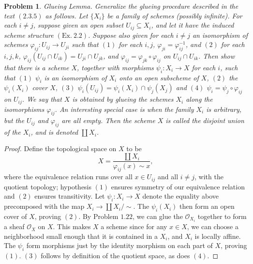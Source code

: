\documentclass[12pt,letterpaper]{article}
\newtheorem{problem}{Problem}[section]
\theoremstyle{definition}
\theoremstyle{remark}
\numberwithin{equation}{section}
\numberwithin{figure}{problem}
\newcommand{\OO}{\mathcal{O}}
\begin{document}
\begin{problem}
  \emph{Glueing Lemma}. Generalize the glueing procedure described in the text $(2.3.5)$ as follows. Let $\{X_i\}$ be a family of schemes (possibly infinite). For each $i \ne j$, suppose given an open subset $U_{ij} \subseteq X_i$, and let it have the induced scheme structure $(\mathrm{Ex}.~2.2)$. Suppose also given for each $i \ne j$ an isomorphism of schemes $\varphi_{ij}\colon U_{ij} \to U_{ji}$ such that $(1)$ for each $i,j$, $\varphi_{ji} = \varphi_{ij}^{-1}$, and $(2)$ for each $i,j,k$, $\varphi_{ij}(U_{ij} \cap U_{ik}) = U_{ji} \cap U_{jk}$, and $\varphi_{ij} = \varphi_{jk} \circ \varphi_{ij}$ on $U_{ij} \cap U_{ik}$. Then show that there is a scheme $X$, together with morphisms $\psi_i\colon X_i \to X$ for each $i$, such that $(1)$ $\psi_i$ is an isomorphism of $X_i$ onto an open subscheme of $X$, $(2)$ the $\psi_i(X_i)$ cover $X$, $(3)$ $\psi_i(U_{ij}) = \psi_i(X_i) \cap \psi_j(X_j)$ and $(4)$ $\psi_i = \psi_j \circ \varphi_{ij}$ on $U_{ij}$. We say that $X$ is obtained by \emph{glueing} the schemes $X_i$ along the isomorphisms $\varphi_{ij}$. An interesting special case is when the family $X_i$ is arbitrary, but the $U_{ij}$ and $\varphi_{ij}$ are all empty. Then the scheme $X$ is called the \emph{disjoint union} of the $X_i$, and is denoted $\coprod X_i$.
\end{problem}
\begin{proof}
  Define the topological space on $X$ to be
  \begin{equation*}
    X = \frac{\displaystyle\coprod X_i}{\varphi_{ij}(x) \sim x},
  \end{equation*}
  where the equivalence relation runs over all $x \in U_{ij}$ and all $i \ne j$, with the quotient topology; hypothesis $(1)$ ensures symmetry of our equivalence relation and $(2)$ ensures transitivity. Let $\psi_i\colon X_i \to X$ denote the equality above precomposed with the map $X_i \to \coprod X_i/\sim$. The $\psi_i(X_i)$ then form an open cover of $X$, proving $(2)$. By Problem $1.22$, we can glue the $\OO_{X_i}$ together to form a sheaf $\OO_X$ on $X$. This makes $X$ a scheme since for any $x \in X$, we can choose a neighborhood small enough that it is contained in a $X_i$, and $X_i$ is locally affine. The $\psi_i$ form morphisms just by the identity morphism on each part of $X$, proving $(1)$. $(3)$ follows by definition of the quotient space, as does $(4)$.
\end{proof}
\end{document}
